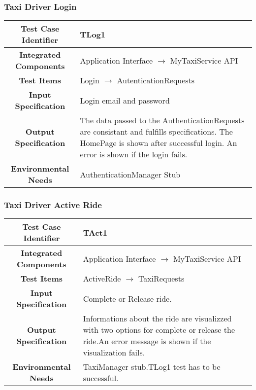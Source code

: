 \documentclass[11pt, a4paper,titlepage]{article}
\begin{document}
	\subsubsection{Taxi Driver Login}
	\begin{tabularx}{\textwidth}{| c|X|}
		\hline \textbf{Test Case Identifier} & \label{TLog1}TLog1 \\
		\hline \textbf{Integrated Components} & Application Interface $\rightarrow $ MyTaxiService API \\
		\hline \textbf{Test Items} & Login $\rightarrow $ AutenticationRequests \\
		\hline \textbf{Input Specification} & Login email and password \\
		\hline \textbf{Output Specification} & 
		The data passed to the AuthenticationRequests are consistant and fulfills specifications.\newline
		The HomePage is shown after successful login.\newline
		An error is shown if the login fails.  \\
		\hline \textbf{Environmental Needs} & AuthenticationManager Stub\\
		\hline
	\end{tabularx}
	\newline
	\newline
	\subsubsection{Taxi Driver Active Ride }
	\begin{tabularx}{\textwidth}{| c|X|}
		\hline \textbf{Test Case Identifier} & \label{TAct1}TAct1 \\
		\hline \textbf{Integrated Components} & Application Interface $\rightarrow $ MyTaxiService API \\
		\hline \textbf{Test Items} & ActiveRide $\rightarrow $ TaxiRequests \\
		\hline \textbf{Input Specification} & Complete or Release ride. \\
		\hline \textbf{Output Specification} & Informations about the ride are visualizzed with two options for complete or release the ride.\newline An error message is shown if the visualization fails. \\
		\hline \textbf{Environmental Needs} & TaxiManager stub.\newline TLog1 test has to be successful. \\
		\hline
	\end{tabularx}
	\newline
	\newline
\end{document}
